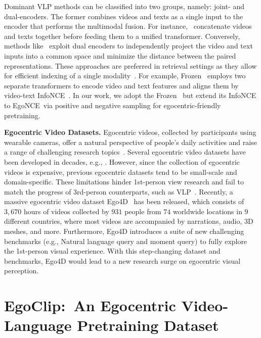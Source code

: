 \documentclass{article}
\newcommand{\dataset}{EgoClip}
\newcommand{\model}{EgoNCE\xspace}
\begin{document}
Dominant VLP methods can be classified into two groups, namely: joint- and dual-encoders. The former combines videos and texts as a single input to the encoder that performs the multimodal fusion. For instance,~\cite{lei2021less,Sun_2019_ICCV} concatenate videos and texts together before feeding them to a unified transformer.
Conversely, methods like~\cite{bain2021frozen,wang2022object} exploit dual encoders to independently project the video and text inputs into a common space and minimize the distance between the paired representations. 
These approaches are preferred in retrieval settings as they allow for efficient indexing of a single modality~\cite{escorcia2019temporal,miech2021thinking}.
For example, Frozen~\cite{bain2021frozen} employs two separate transformers to encode video and text features and aligns them by video-text InfoNCE~\cite{infonce}.
In our work, we adopt the Frozen~\cite{bain2021frozen} but extend its InfoNCE to \model~via positive and negative sampling for egocentric-friendly pretraining.

\noindent\textbf{Egocentric Video Datasets.}
Egocentric videos, collected by participants using wearable cameras, offer a natural perspective of people's daily activities and raise a range of challenging research topics~\cite{caba2015activitynet, abu2018will, wong2022assistq}.
Several egocentric video datasets have been developed in decades, e.g., \cite{damen2022rescaling, sigurdsson2018charades, li2015delving}.
However, since the collection of egocentric videos is expensive, previous egocentric datasets tend to be small-scale and domain-specific.
These limitations hinder 1st-person view research and fail to match the progress of 3rd-person counterparts, such as VLP~\cite{miech2020end,lei2021less,bain2021frozen}.
Recently, a massive egocentric video dataset Ego4D~\cite{grauman2021ego4d} has been released, which consists of $3,670$ hours of videos collected by $931$ people from $74$ worldwide locations in $9$ different countries, where most videos are accompanied by narrations, audio, 3D meshes, and more.
Furthermore, Ego4D introduces a suite of new challenging benchmarks (e.g., Natural language query and moment query) to fully explore the 1st-person visual experience.
With this step-changing dataset and benchmarks, Ego4D would lead to a new research surge on egocentric visual perception. \section{\dataset:~An Egocentric Video-Language Pretraining Dataset}
\end{document}
